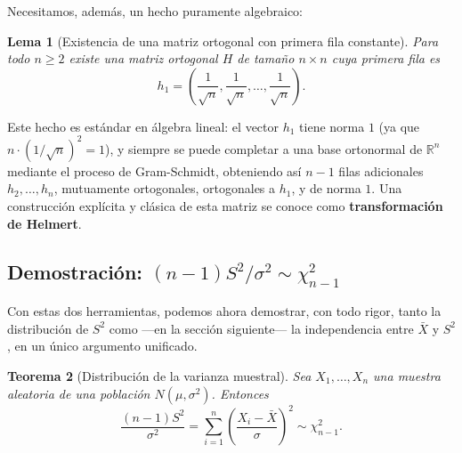 \documentclass[11pt,a4paper]{article}
\theoremstyle{plain}
\newtheorem{teorema}{Teorema}[section]
\newtheorem{lema}[teorema]{Lema}
\theoremstyle{definition}
\theoremstyle{remark}
\begin{document}
Necesitamos, además, un hecho puramente algebraico:

\begin{lema}[Existencia de una matriz ortogonal con primera fila constante]
\label{lema:helmert}
Para todo $n\geq 2$ existe una matriz ortogonal $H$ de tamaño $n\times n$ cuya primera fila es
$$h_1 = \left(\frac{1}{\sqrt n},\frac{1}{\sqrt n},\dots,\frac{1}{\sqrt n}\right).$$
\end{lema}

Este hecho es estándar en álgebra lineal: el vector $h_1$ tiene norma $1$ (ya que $n\cdot(1/\sqrt n)^2=1$), y siempre se puede completar a una base ortonormal de $\mathbb{R}^n$ mediante el proceso de Gram-Schmidt, obteniendo así $n-1$ filas adicionales $h_2,\dots,h_n$, mutuamente ortogonales, ortogonales a $h_1$, y de norma $1$. Una construcción explícita y clásica de esta matriz se conoce como \textbf{transformación de Helmert}.

\subsection{Demostración: $(n-1)S^2/\sigma^2 \sim \chi^2_{n-1}$}

Con estas dos herramientas, podemos ahora demostrar, con todo rigor, tanto la distribución de $S^2$ como —en la sección siguiente— la independencia entre $\bar X$ y $S^2$, en un único argumento unificado.

\begin{teorema}[Distribución de la varianza muestral]
\label{teo:chi2}
Sea $X_1,\dots,X_n$ una muestra aleatoria de una población $N(\mu,\sigma^2)$. Entonces
$$\frac{(n-1)S^2}{\sigma^2} = \sum_{i=1}^n\left(\frac{X_i-\bar X}{\sigma}\right)^2 \sim \chi^2_{n-1}.$$
\end{teorema}
\end{document}
